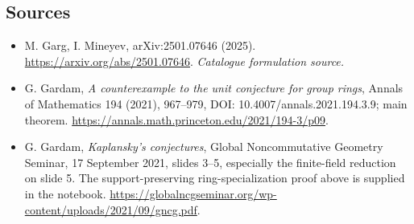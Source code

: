 \documentclass[11pt,a4paper]{article}
\begin{document}
\subsection{Sources}
\begin{itemize}\raggedright
\item[\textnormal{[S1]}]\hypertarget{source:204:1}{} M. Garg, I. Mineyev, arXiv:2501.07646 (2025).
\url{https://arxiv.org/abs/2501.07646}.
{\small\textit{Catalogue formulation source.}}
\item[\textnormal{[E1]}]\hypertarget{extra:204:1}{}
G. Gardam, \emph{A counterexample to the unit conjecture for group rings},
Annals of Mathematics 194 (2021), 967--979,
DOI: 10.4007/annals.2021.194.3.9; main theorem.
\url{https://annals.math.princeton.edu/2021/194-3/p09}.
\item[\textnormal{[E2]}]\hypertarget{extra:204:2}{}
G. Gardam, \emph{Kaplansky's conjectures}, Global Noncommutative Geometry
Seminar, 17 September 2021, slides 3--5, especially the finite-field
reduction on slide 5. The support-preserving ring-specialization proof
above is supplied in the notebook.
\url{https://globalncgseminar.org/wp-content/uploads/2021/09/gncg.pdf}.
\end{itemize}
\end{document}
